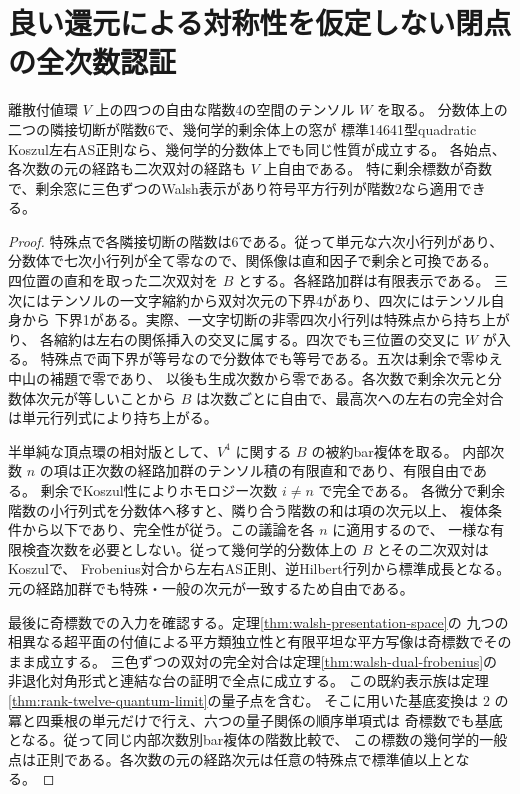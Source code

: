 \section{良い還元による対称性を仮定しない閉点の全次数認証}
\label{sec:unrestricted-good-reduction}
\begin{proposition}\label{prop:unrestricted-good-reduction}
離散付値環 $V$ 上の四つの自由な階数4の空間のテンソル $W$ を取る。
分数体上の二つの隣接切断が階数6で、幾何学的剰余体上の窓が
標準14641型quadratic Koszul左右AS正則なら、幾何学的分数体上でも同じ性質が成立する。
各始点、各次数の元の経路も二次双対の経路も $V$ 上自由である。
特に剰余標数が奇数で、剰余窓に三色ずつのWalsh表示があり符号平方行列が階数2なら適用できる。
\end{proposition}
\begin{proof}
特殊点で各隣接切断の階数は6である。従って単元な六次小行列があり、
分数体で七次小行列が全て零なので、関係像は直和因子で剰余と可換である。
四位置の直和を取った二次双対を $B$ とする。各経路加群は有限表示である。
三次にはテンソルの一文字縮約から双対次元の下界4があり、四次にはテンソル自身から
下界1がある。実際、一文字切断の非零四次小行列は特殊点から持ち上がり、
各縮約は左右の関係挿入の交叉に属する。四次でも三位置の交叉に $W$ が入る。
特殊点で両下界が等号なので分数体でも等号である。五次は剰余で零ゆえ中山の補題で零であり、
以後も生成次数から零である。各次数で剰余次元と分数体次元が等しいことから
$B$ は次数ごとに自由で、最高次への左右の完全対合は単元行列式により持ち上がる。

半単純な頂点環の相対版として、$V^4$ に関する $B$ の被約bar複体を取る。
内部次数 $n$ の項は正次数の経路加群のテンソル積の有限直和であり、有限自由である。
剰余でKoszul性によりホモロジー次数 $i\ne n$ で完全である。
各微分で剰余階数の小行列式を分数体へ移すと、隣り合う階数の和は項の次元以上、
複体条件から以下であり、完全性が従う。この議論を各 $n$ に適用するので、
一様な有限検査次数を必要としない。従って幾何学的分数体上の $B$ とその二次双対はKoszulで、
Frobenius対合から左右AS正則、逆Hilbert行列から標準成長となる。
元の経路加群でも特殊・一般の次元が一致するため自由である。

最後に奇標数での入力を確認する。定理\ref{thm:walsh-presentation-space}の
九つの相異なる超平面の付値による平方類独立性と有限平坦な平方写像は奇標数でそのまま成立する。
三色ずつの双対の完全対合は定理\ref{thm:walsh-dual-frobenius}の
非退化対角形式と連結な台の証明で全点に成立する。
この既約表示族は定理\ref{thm:rank-twelve-quantum-limit}の量子点を含む。
そこに用いた基底変換は $2$ の冪と四乗根の単元だけで行え、六つの量子関係の順序単項式は
奇標数でも基底となる。従って同じ内部次数別bar複体の階数比較で、
この標数の幾何学的一般点は正則である。各次数の元の経路次元は任意の特殊点で標準値以上となる。


\end{proof}
